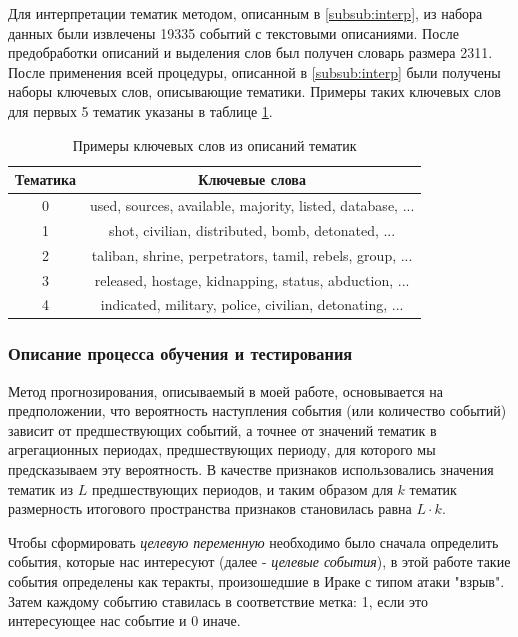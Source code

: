 Для интерпретации тематик методом, описанным в \ref{subsub:interp}, из набора данных были извлечены 19335 событий с текстовыми описаниями. После предобработки описаний и выделения слов был получен словарь размера 2311. После применения всей процедуры, описанной в \ref{subsub:interp} были получены наборы ключевых слов, описывающие тематики. Примеры таких ключевых слов для первых 5 тематик указаны в таблице \ref{table:kw_example}.

\begin{table}
\centering
 \begin{tabular}{c c} 
 \hline
 Тематика & Ключевые слова\\ 
 \hline
 \hline
 0 & used, sources, available, majority, listed, database, ...\\
 \hline
 1 & shot, civilian, distributed, bomb, detonated, ...\\
 \hline
 2 & taliban, shrine, perpetrators, tamil, rebels, group, ...\\
 \hline
 3 & released, hostage, kidnapping, status, abduction, ...\\
 \hline
 4 & indicated, military, police, civilian, detonating, ...\\
 \hline
 \end{tabular}
\caption{Примеры ключевых слов из описаний тематик }
\label{table:kw_example}
\end{table}


\subsubsection{Описание процесса обучения и тестирования} \label{train_process}
Метод прогнозирования, описываемый в моей работе, основывается на предположении, что вероятность наступления события (или количество событий) зависит от предшествующих событий, а точнее от значений тематик в агрегационных периодах, предшествующих периоду, для которого мы предсказываем эту вероятность.
В качестве признаков использовались значения тематик из $L$ предшествующих периодов, и таким образом для $k$ тематик размерность итогового пространства признаков становилась равна $L \cdot k$.

Чтобы сформировать \textit{целевую переменную} необходимо было сначала определить события, которые нас интересуют (далее - \textit{целевые события}), в этой работе такие события определены как теракты, произошедшие в Ираке с типом атаки "взрыв". Затем каждому событию ставилась в соответствие метка: 1, если это интересующее нас событие и 0 иначе. 

